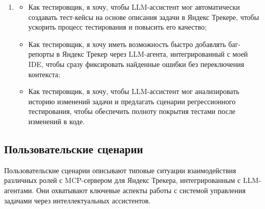 \documentclass[utf8, russian]{eskdtext}
\begin{document}
\begin{enumerate}
    \item {}
    \begin{itemize}
        \item Как тестировщик, я хочу, чтобы LLM-ассистент мог автоматически создавать тест-кейсы на основе описания задачи в Яндекс Трекере, чтобы ускорить процесс тестирования и повысить его качество;
        \item Как тестировщик, я хочу иметь возможность быстро добавлять баг-репорты в Яндекс Трекер через LLM-агента, интегрированный с моей IDE, чтобы сразу фиксировать найденные ошибки без переключения контекста;
        \item Как тестировщик, я хочу, чтобы LLM-ассистент мог анализировать историю изменений задачи и предлагать сценарии регрессионного тестирования, чтобы обеспечить полноту покрытия тестами после изменений в коде.
    \end{itemize}
\end{enumerate}


\subsection{Пользовательские сценарии}

Пользовательские сценарии описывают типовые ситуации взаимодействия различных ролей с MCP-сервером для Яндекс Трекера, интегрированным с LLM-агентами. Они охватывают ключевые аспекты работы с системой управления задачами через интеллектуальных ассистентов.
\end{document}
